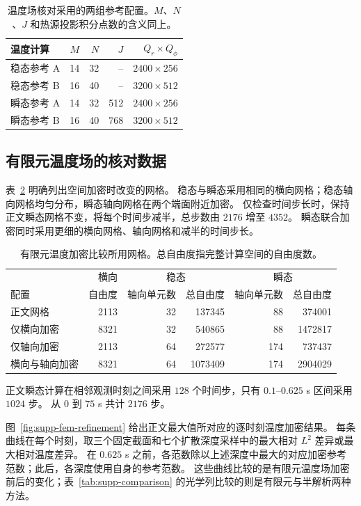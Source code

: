 \documentclass[9pt]{osa-supplemental-document}
\begin{document}
\begin{table}[!htbp]\centering\small
\caption{温度场核对采用的两组参考配置。$M$、$N$、$J$ 和热源投影积分点数的含义同上。}\label{tab:supp-temperature-settings}
\begin{tabular}{lrrrr}\toprule
温度计算 & $M$ & $N$ & $J$ & $Q_r\times Q_\phi$\\\midrule
稳态参考 A & 14 & 32 & -- & $2400\times256$\\
稳态参考 B & 16 & 40 & -- & $3200\times512$\\
瞬态参考 A & 14 & 32 & 512 & $2400\times256$\\
瞬态参考 B & 16 & 40 & 768 & $3200\times512$\\\bottomrule
\end{tabular}
\end{table}

\FloatBarrier

\subsection*{有限元温度场的核对数据}
表~\ref{tab:supp-fem-settings} 明确列出空间加密时改变的网格。
稳态与瞬态采用相同的横向网格；稳态轴向网格均匀分布，瞬态轴向网格在两个端面附近加密。
仅检查时间步长时，保持正文瞬态网格不变，将每个时间步减半，总步数由 $2176$ 增至 $4352$。
瞬态联合加密同时采用更细的横向网格、轴向网格和减半的时间步长。

\begin{table}[!htbp]\centering\small
\caption{有限元温度加密比较所用网格。总自由度指完整计算空间的自由度数。}\label{tab:supp-fem-settings}
\begin{tabular}{lrrrrr}\toprule
 & 横向 & \multicolumn{2}{c}{稳态} & \multicolumn{2}{c}{瞬态}\\
配置 & 自由度 & 轴向单元数 & 总自由度 & 轴向单元数 & 总自由度\\\midrule
正文网格 & 2113 & 32 & 137345 & 88 & 374001\\
仅横向加密 & 8321 & 32 & 540865 & 88 & 1472817\\
仅轴向加密 & 2113 & 64 & 272577 & 174 & 737437\\
横向与轴向加密 & 8321 & 64 & 1073409 & 174 & 2904029\\\bottomrule
\end{tabular}
\end{table}
正文瞬态计算在相邻观测时刻之间采用 $128$ 个时间步，只有 $0.1$--$0.625$ s 区间采用 $1024$ 步。
从 $0$ 到 $75$ s 共计 $2176$ 步。

图~\ref{fig:supp-fem-refinement} 给出正文最大值所对应的逐时刻温度加密结果。
每条曲线在每个时刻，取三个固定截面和七个扩散深度采样中的最大相对 $L^2$ 差异或最大相对温度差异。
在 $0.625$ s 之前，各范数除以上述深度中最大的对应加密参考范数；此后，各深度使用自身的参考范数。
这些曲线比较的是有限元温度场加密前后的变化；表~\ref{tab:supp-comparison} 的光学列比较的则是有限元与半解析两种方法。
\end{document}
